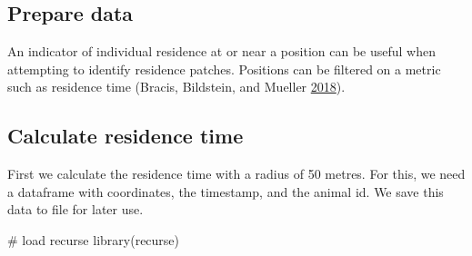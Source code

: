 \documentclass[]{scrreprt}
\newenvironment{Shaded}{}{}
\newcommand{\CommentTok}[1]{\textcolor[rgb]{0.00,0.50,0.00}{#1}}
\newcommand{\DataTypeTok}[1]{#1}
\newcommand{\DecValTok}[1]{#1}
\newcommand{\ErrorTok}[1]{\textcolor[rgb]{1.00,0.00,0.00}{\textbf{#1}}}
\newcommand{\KeywordTok}[1]{\textcolor[rgb]{0.00,0.00,1.00}{#1}}
\newcommand{\NormalTok}[1]{#1}
\newcommand{\OperatorTok}[1]{#1}
\newcommand{\StringTok}[1]{\textcolor[rgb]{0.00,0.50,0.50}{#1}}
\begin{document}
\hypertarget{prepare-data}{%
\subsection{Prepare data}\label{prepare-data}}

An indicator of individual residence at or near a position can be useful when attempting to identify residence patches. Positions can be filtered on a metric such as residence time (Bracis, Bildstein, and Mueller \protect\hyperlink{ref-bracis2018}{2018}).

\hypertarget{calculate-residence-time}{%
\subsection{Calculate residence time}\label{calculate-residence-time}}

First we calculate the residence time with a radius of 50 metres.
For this, we need a dataframe with coordinates, the timestamp, and the animal id.
We save this data to file for later use.

\begin{Shaded}
\begin{Highlighting}[]
\CommentTok{# load recurse}
\KeywordTok{library}\NormalTok{(recurse)}
\end{Highlighting}
\end{Shaded}

\begin{Shaded}
\end{Shaded}
\end{document}
